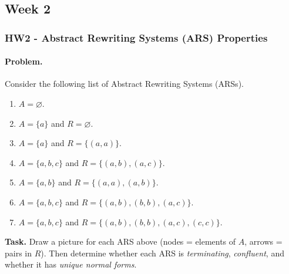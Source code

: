 \documentclass{article}
\theoremstyle{theorem}
\theoremstyle{definition}
\theoremstyle{remark}
\begin{document}
\subsection{Week 2}
\subsubsection{HW2 - Abstract Rewriting Systems (ARS) Properties}

\paragraph{Problem.}
Consider the following list of Abstract Rewriting Systems (ARSs).
\begin{enumerate}
  \item $A=\varnothing$.
  \item $A=\{a\}$ \; and \; $R=\varnothing$.
  \item $A=\{a\}$ \; and \; $R=\{(a,a)\}$.
  \item $A=\{a,b,c\}$ \; and \; $R=\{(a,b),(a,c)\}$.
  \item $A=\{a,b\}$ \; and \; $R=\{(a,a),(a,b)\}$.
  \item $A=\{a,b,c\}$ \; and \; $R=\{(a,b),(b,b),(a,c)\}$.
  \item $A=\{a,b,c\}$ \; and \; $R=\{(a,b),(b,b),(a,c),(c,c)\}$.
\end{enumerate}

\noindent\textbf{Task.} Draw a picture for each ARS above (nodes = elements of $A$, arrows = pairs in $R$).
Then determine whether each ARS is \emph{terminating}, \emph{confluent}, and whether it has \emph{unique normal forms}.


\medskip

\begin{center}
\end{center}

\begin{center}
\end{center}
\end{document}
